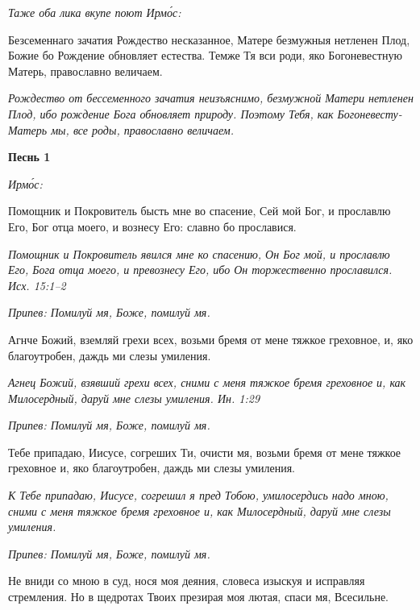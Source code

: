 \itshape Таже оба лика вкупе поют Ирмо́с:\normalfont{}


Безсеменнаго зачатия Рождество несказанное, Матере безмужныя нетленен Плод, Божие бо Рождение обновляет естества. Темже Тя вси роди, яко Богоневестную Матерь, православно величаем.


\itshape Рождество от бессеменного зачатия неизъяснимо, безмужной Матери нетленен Плод, ибо рождение Бога обновляет природу. Поэтому Тебя, как Богоневесту-Матерь мы, все роды, православно величаем.\normalfont{}




\mychapterending








\bfseries Песнь 1\normalfont{}


\itshape Ирмо́с:\normalfont{}


Помощник и Покровитель бысть мне во спасение, Сей мой Бог, и прославлю Его, Бог отца моего, и вознесу Его: славно бо прославися.


\itshape Помощник и Покровитель явился мне ко спасению, Он Бог мой, и прославлю Его, Бога отца моего, и превознесу Его, ибо Он торжественно прославился. Исх. 15:1–2\normalfont{}


\itshape Припев:\normalfont{} Помилуй мя, Боже, помилуй мя.


Агнче Божий, вземляй грехи всех, возьми бремя от мене тяжкое греховное, и, яко благоутробен, даждь ми слезы умиления.


\itshape Агнец Божий, взявший грехи всех, сними с меня тяжкое бремя греховное и, как Милосердный, даруй мне слезы умиления. Ин. 1:29\normalfont{}


\itshape Припев:\normalfont{} Помилуй мя, Боже, помилуй мя.


Тебе припадаю, Иисусе, согреших Ти, очисти мя, возьми бремя от мене тяжкое греховное и, яко благоутробен, даждь ми слезы умиления.


\itshape К Тебе припадаю, Иисусе, согрешил я пред Тобою, умилосердись надо мною, сними с меня тяжкое бремя греховное и, как Милосердный, даруй мне слезы умиления.\normalfont{}


\itshape Припев:\normalfont{} Помилуй мя, Боже, помилуй мя.


Не вниди со мною в суд, нося моя деяния, словеса изыскуя и исправляя стремления. Но в щедротах Твоих презирая моя лютая, спаси мя, Всесильне.


